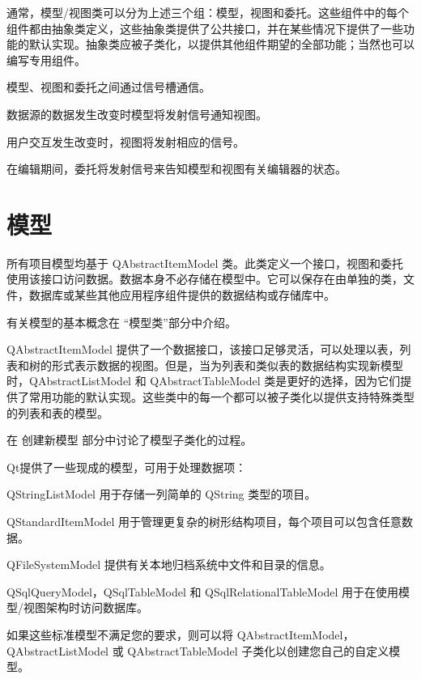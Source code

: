 通常，模型/视图类可以分为上述三个组：模型，视图和委托。这些组件中的每个组件都由抽象类定义，这些抽象类提供了公共接口，并在某些情况下提供了一些功能的默认实现。抽象类应被子类化，以提供其他组件期望的全部功能；当然也可以编写专用组件。

模型、视图和委托之间通过信号槽通信。

\begin{compactitem}
	\item 数据源的数据发生改变时模型将发射信号通知视图。
\item 用户交互发生改变时，视图将发射相应的信号。
\item 在编辑期间，委托将发射信号来告知模型和视图有关编辑器的状态。
\end{compactitem}


\section{模型}

所有项目模型均基于 QAbstractItemModel 类。此类定义一个接口，视图和委托使用该接口访问数据。数据本身不必存储在模型中。它可以保存在由单独的类，文件，数据库或某些其他应用程序组件提供的数据结构或存储库中。


有关模型的基本概念在 “模型类”部分中介绍。


QAbstractItemModel 提供了一个数据接口，该接口足够灵活，可以处理以表，列表和树的形式表示数据的视图。但是，当为列表和类似表的数据结构实现新模型时，QAbstractListModel 和 QAbstractTableModel 类是更好的选择，因为它们提供了常用功能的默认实现。这些类中的每一个都可以被子类化以提供支持特殊类型的列表和表的模型。


在 创建新模型 部分中讨论了模型子类化的过程。


Qt提供了一些现成的模型，可用于处理数据项：

\begin{compactitem}
\item QStringListModel 用于存储一列简单的 QString 类型的项目。
\item QStandardItemModel 用于管理更复杂的树形结构项目，每个项目可以包含任意数据。
\item QFileSystemModel 提供有关本地归档系统中文件和目录的信息。
\item QSqlQueryModel，QSqlTableModel 和 QSqlRelationalTableModel 用于在使用模型/视图架构时访问数据库。
\end{compactitem}


如果这些标准模型不满足您的要求，则可以将 QAbstractItemModel，QAbstractListModel 或 QAbstractTableModel 子类化以创建您自己的自定义模型。

